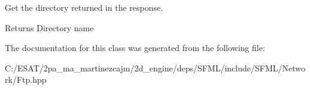 Get the directory returned in the response. 

\begin{DoxyReturn}{Returns}
Directory name 
\end{DoxyReturn}


The documentation for this class was generated from the following file\+:\begin{DoxyCompactItemize}
\item 
C\+:/\+E\+S\+A\+T/2pa\+\_\+ma\+\_\+martinezcajm/2d\+\_\+engine/deps/\+S\+F\+M\+L/include/\+S\+F\+M\+L/\+Network/Ftp.\+hpp\end{DoxyCompactItemize}
